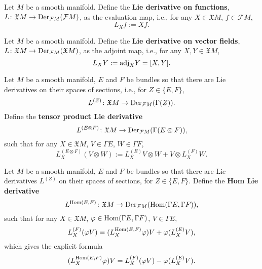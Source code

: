 \begin{definition}
  Let $M$ be a smooth manifold.
  Define the \textbf{Lie derivative on functions},
  $L \colon \mathfrak{X} M \to {\rm Der}_{\mathcal{F} M}(\mathcal{F} M)$,
  as the evaluation map, i.e.,
  for any $X \in \mathfrak{X} M$, $f \in \mathcal{F} M$,
  \begin{equation}
    L_X f := X f.
  \end{equation}
\end{definition}
\begin{definition}
  Let $M$ be a smooth manifold.
  Define the \textbf{Lie derivative on vector fields},
  $L \colon \mathfrak{X} M \to {\rm Der}_{\mathcal{F} M}(\mathfrak{X} M)$,
  as the adjoint map, i.e., for any $X, Y \in \mathfrak{X} M$,
  \begin{equation}
    L_X Y := {\rm adj}_X Y = [X, Y].
  \end{equation}
\end{definition}
\begin{definition}
  Let $M$ be a smooth manifold, $E$ and $F$ be bundles so that there are
  Lie derivatives on their spaces of sections, i.e., for $Z \in \{E, F\}$,
  \begin{equation}
    L^{(Z)} \colon \mathfrak{X} M \to {\rm Der}_{\mathcal{F} M}(\Gamma(Z)).
  \end{equation}
  Define the \textbf{tensor product Lie derivative}
  \begin{equation}
    L^{(E \otimes F)}
    \colon \mathfrak{X} M \to {\rm Der}_{\mathcal{F} M}(\Gamma(E \otimes F)),
  \end{equation}
  such that for any $X \in \mathfrak{X} M$, $V \in \Gamma E$, $W \in \Gamma F$,
  \begin{equation}
    L^{(E \otimes F)}_X(V \otimes W)
    := L^{(E)}_X V \otimes W + V \otimes L^{(F)}_X W.
  \end{equation}
\end{definition}
\begin{definition}
  Let $M$ be a smooth manifold, $E$ and $F$ be bundles so that there are
  Lie derivatives $L^{(Z)}$ on their spaces of sections, for $Z \in \{E, F\}$.
  Define the \textbf{Hom Lie derivative}
  \begin{equation}
    L^{\mathop{\rm Hom}\nolimits(E, F)}
    \colon \mathfrak{X} M
    \to {\rm Der}_{\mathcal{F} M}(\mathop{\rm Hom}\nolimits(\Gamma E, \Gamma F)),
  \end{equation}
  such that for any
    $X \in \mathfrak{X} M$,
    $\varphi \in \mathop{\rm Hom}\nolimits(\Gamma E, \Gamma F)$,
    $V \in \Gamma E$,
  \begin{equation}
    L^{(F)}_X(\varphi V) = (L^{\mathop{\rm Hom}\nolimits(E, F)}_X \varphi) V + \varphi(L^{(E)}_X V),
  \end{equation}
  which gives the explicit formula
  \begin{equation}
    (L^{\mathop{\rm Hom}\nolimits(E, F)}_X \varphi) V = L^{(F)}_X(\varphi V) - \varphi(L^{(E)}_X V).
  \end{equation}
\end{definition}
